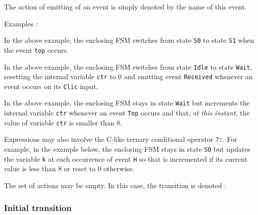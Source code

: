 \medskip
The action of emitting of an event  is simply denoted by the name of this event.

\medskip
Examples :

\begin{center}
\end{center}

In the above example, the enclosing FSM switches from state \verb|S0| to state \verb|S1| when the
event \verb|top| occurs. 

\begin{center}
\end{center}

In the above example, the enclosing FSM switches from state \verb|Idle| to state \verb|Wait|, resetting the internal variable
  \verb|ctr| to 0 and emitting event \verb|Received| whenever an event occurs on its \verb|Clic| input.

\begin{center}
\end{center}

In the above example, the enclosing FSM stays in state \verb|Wait| but increments the internal
variable \verb|ctr| whenever an event \verb|Top| occurs and that, \emph{at this instant}, the
value of variable \verb|ctr| is smaller than 8. 

\medskip
Expressions may also involve the C-like ternary conditional operator \verb|?:|.
For example, in the example below, the enclosing FSM stays in state \verb|S0| but updates the variable \verb|k|
at each occurrence of event \verb|H| so that is incremented if its current value is less than 8 or
reset to 0 otherwise.

\begin{center}
\end{center}


\medskip
The set of actions may be empty. In this case, the transition is denoted :

\begin{center}
\end{center}

\subsubsection*{Initial transition}
\label{sec:initial-transition}

